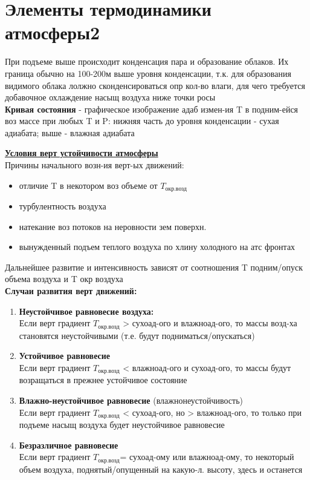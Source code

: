 
\section{Элементы термодинамики атмосферы2}
При подъеме выше происходит конденсация пара и образование облаков. Их граница обычно на 100-200м выше уровня конденсации, т.к. для образования видимого облака лолжно сконденсироваться опр кол-во влаги, для чего требуется добавочное охлаждение насыщ воздуха ниже точки росы\\
\textbf{Кривая состояния} - графическое изображение адаб измен-ия T в подним-ейся воз массе при любых T и P: нижняя часть до уровня конденсации - сухая адиабата; выше - влажная адиабата\\
\par \underline{\textbf{Условия верт устойчивости атмосферы}}\\
Причины начального возн-ия верт-ых движений:
\begin{itemize}
	\item отличие T в некотором воз объеме от $T_\text{окр.возд}$
	\item турбулентность воздуха
	\item натекание воз потоков на неровности зем поверхн.
	\item вынужденный подъем теплого воздуха по хлину холодного на атс фронтах
\end{itemize}
Дальнейшее развитие и интенсивность зависят от соотношения T подним/опуск объема воздуха и T окр воздуха\\
\textbf{Случаи развития верт движений:}
\begin{enumerate}
	\item \textbf{Неустойчивое равновесие воздуха:}\\
	Если верт градиент $T_\text{окр.возд}$ > сухоад-ого и влажноад-ого, то массы возд-ха становятся неустойчивыми (т.е. будут подниматься/опускаться)
	\item \textbf{Устойчивое равновесие}\\
	Если верт градиент $T_\text{окр.возд}$ < влажноад-ого и сухоад-ого, то массы будут возращаться в прежнее устойчивое состояние
	\item \textbf{Влажно-неустойчивое равновесие} (влажнонеустойчивость)\\
	Если верт градиент $T_\text{окр.возд}$ < сухоад-ого, но > влажноад-ого, то только при подъеме насыщ воздуха будет неустойчивое равновесие
	\item \textbf{Безразличное равновесие}\\
	Если верт градиент $T_\text{окр.возд}$= сухоад-ому или влажноад-ому, то некоторый объем воздуха, поднятый/опущенный на какую-л. высоту, здесь и останется
\end{enumerate}
